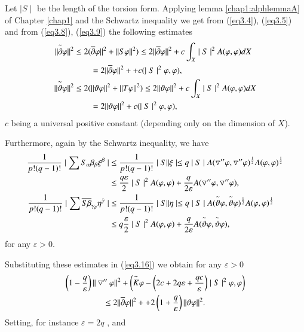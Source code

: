 Let $\mid  S \mid$  be the length of the torsion form. Applying lemma
\ref{chap1:alphlemmaA} of Chapter \ref{chap1} and the Schwartz
inequality we get from (\ref{eq3.4}), (\ref{eq3.5}) 
and from (\ref{eq3.8}), (\ref{eq3.9}) the following estimates 
\begin{align*}
  \|\overset{\thicksim}\partial \varphi\|^2 & \leq
  2(\overline{\partial}\varphi\|^2 + \|S\varphi\|^2)\leq 2
  \|\overline{\partial}\varphi\|^2 + c\int_X \mid S \mid^2 A(\varphi,
  \varphi)dX\\ 
  & \qquad = 2\|\overline{\partial}\varphi\|^2 +
  + c(\mid S \mid^2 \varphi,\varphi),\\
  \|\overset{\thicksim}\vartheta\varphi\|^2 & \leq
  2(\|\vartheta \varphi\|^2 + \|T\varphi\|^2) \leq 2\| \vartheta \varphi\|^2 +
  c\int_X \mid S \mid^2 A(\varphi, \varphi)dX\\ 
  & \qquad = 2\|\vartheta \varphi \|^2 + c(\mid S \mid^2 \varphi,
  \varphi), 
\end{align*}
$c$ being a universal positive constant (depending only on the
dimension of $X$). 

Furthermore, again by the Schwartz inequality, we have\pageoriginale
{\fontsize{10}{12}\selectfont
\begin{align*}
  \frac{1}{p!(q-1)!} \mid\sum S_{\alpha} \beta_{\beta} \xi^\beta \mid
  & \leq \frac{1}{p!(q-1)!} \mid S \| \xi\mid \leq q\mid S \mid
  A(\triangledown''\varphi,\triangledown''\varphi)^{\frac{1}{2}}
  A(\varphi,\varphi)^{\frac{1}{2}}\\ 
  & \leq \frac{q\varepsilon}{2}\mid S \mid^2 A (\varphi,\varphi) +
  \frac{q}{2\varepsilon} A(\triangledown'' \varphi,\triangledown'' \varphi),\\ 
  \frac{1}{p!(q-1)!}\mid \sum \overline{S
    \beta}_{\gamma_\beta}\eta^{\bar{\gamma}}\mid & \leq
  \frac{1}{p!(q-1)!}\mid S \|\eta\mid \leq q\mid S \mid
  A(\overset{\thicksim}{\vartheta} \varphi,
  \overset{\thicksim}{\vartheta} \varphi)^{\frac{1}{2}} 
  A(\varphi,\varphi)^{\frac{1}{2}} \\ 
  & \leq q\frac{\varepsilon}{2}\mid S \mid^2 A (\varphi, \varphi) +
  \frac{q}{2\varepsilon} A (\overset{\thicksim}{\vartheta} \varphi,
  \overset{\thicksim}{\vartheta}\varphi),
\end{align*}}\relax
for any $\varepsilon > 0.$

Substituting these estimates in (\ref{eq3.16}) we obtain for any $\varepsilon >
0$  
\begin{multline*}
  \left(1-\frac{q}{\varepsilon}\right) \|\bigtriangledown'' \varphi\|^2 +
  \left(\overset{\thicksim}{K}\varphi - \left(2c+2q\varepsilon +
  \frac{qc}{\varepsilon}\right) \mid S \mid^2  \varphi,\varphi\right)\\
  \leq 2
  \|\overline{\partial}\varphi\|^2 + 
  +2 \left(1 +\frac{q}{\varepsilon}\right) \|\vartheta \varphi\|^2.
\end{multline*}
Setting, for instance $\varepsilon = 2q$ , and\\

